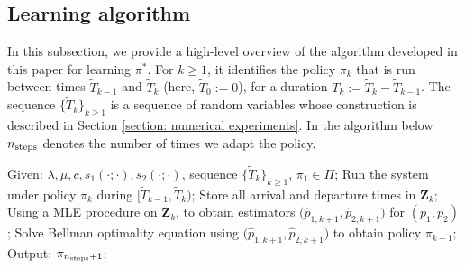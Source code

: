 \documentclass[11pt]{article}
\theoremstyle{remark}
\theoremstyle{definition}
\newcommand{\bs}[1]{{\boldsymbol #1 }}
\numberwithin{equation}{section}
\begin{document}
\subsection{Learning algorithm}\label{subsection: model description: learning algorithm}
In this subsection, we provide a high-level overview of the algorithm developed in this paper for learning $\pi^*$. 
For $k \geq 1$, it identifies the policy $\pi_k$ that is run between times $\widetilde T_{k-1}$ and $\widetilde T_k$ (here, $\widetilde{T}_0 := 0$), for a duration $T_k:= \widetilde T_k-\widetilde T_{k-1}$. 
The sequence $\big\{\widetilde{T}_k\big\}_{k \geq 1}$ is a sequence of random variables whose construction is described in Section \ref{section: numerical experiments}.
In the algorithm below $n_{\rm steps}$ denotes the number of times we adapt the policy.
\begin{algorithm}[H]
\caption{High-level solution outline}
\label{alg: high level outline}
\begin{algorithmic}[1]
\State Given: $\lambda, \mu, c, s_1(\cdot;\cdot), s_2(\cdot;\cdot)$, sequence $\big\{\widetilde{T}_k\big\}_{k \geq 1}$, $\pi_1 \in \Pi$;
\State Run the system under policy $\pi_k$ during $\big[\widetilde{T}_{k-1}, \widetilde{T}_k\big)$;
\State Store all arrival and departure times in $\bs{Z}_k$;
\State Using a MLE procedure on $\bs{Z}_k$, to obtain estimators $\big(\widehat{p}_{1,k+1}$,$\,\widehat{p}_{2,k+1}\big)$ for $(p_1, p_2)$;
\State Solve Bellman optimality equation using $\big(\widehat{p}_{1,k+1}$,\,$\widehat{p}_{2,k+1}\big)$ to obtain policy $\pi_{k+1}$;
\EndFor
\State Output: $\pi_{n_{\rm steps}+1}$;
\end{algorithmic}
\end{algorithm}

\end{document}
